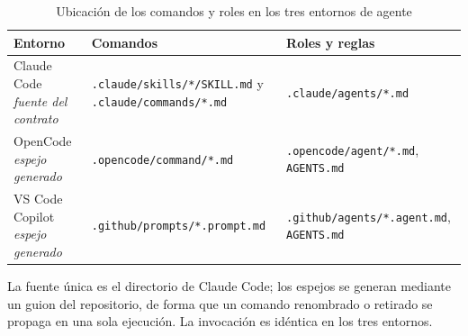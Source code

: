 \documentclass[11pt,a4paper]{article}
\begin{document}
\begin{table}[H]
\centering
\caption{Ubicación de los comandos y roles en los tres entornos de agente}
\label{tab:portabilidad}
\small
\begin{tabularx}{\textwidth}{L{3.4cm} X X}
\toprule
\textbf{Entorno} & \textbf{Comandos} & \textbf{Roles y reglas} \\
\midrule
Claude Code \newline \emph{fuente del contrato} & \texttt{.claude/skills/*/SKILL.md} y \texttt{.claude/commands/*.md} & \texttt{.claude/agents/*.md} \\
OpenCode \newline \emph{espejo generado} & \texttt{.opencode/command/*.md} & \texttt{.opencode/agent/*.md}, \texttt{AGENTS.md} \\
VS Code Copilot \newline \emph{espejo generado} & \texttt{.github/prompts/*.prompt.md} & \texttt{.github/agents/*.agent.md}, \texttt{AGENTS.md} \\
\bottomrule
\end{tabularx}
\end{table}

La fuente única es el directorio de Claude Code; los espejos se generan mediante un guion del
repositorio, de forma que un comando renombrado o retirado se propaga en una sola ejecución. La
invocación es idéntica en los tres entornos.
\end{document}
